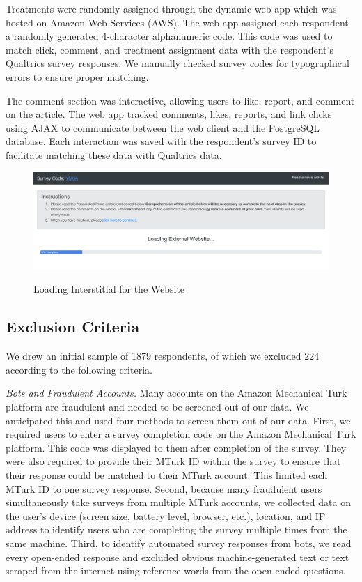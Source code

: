 \documentclass[]{article}
\begin{document}
Treatments were randomly assigned through the dynamic web-app which was hosted on Amazon Web Services (AWS). The web app assigned each respondent a randomly generated 4-character alphanumeric code. This code was used to match click, comment, and treatment assignment data with the respondent's Qualtrics survey responses. We manually checked survey codes for typographical errors to ensure proper matching.

The comment section was interactive, allowing users to like, report, and comment on the article. The web app tracked comments, likes, reports, and link clicks using AJAX to communicate between the web client and the PostgreSQL database. Each interaction was saved with the respondent's survey ID to facilitate matching these data with Qualtrics data.

\vspace{-1em}
\begin{figure}[!htbp]
  \centering
  \caption{Loading Interstitial for the Website}
  \vspace{1em}
  \includegraphics[width=.9\textwidth]{figures/loading_interstitial.pdf}\\
  \label{hom_uns}
\end{figure}

\subsection{Exclusion Criteria}

We drew an initial sample of 1879 respondents, of which we excluded 224 according to the following criteria.

\textit{Bots and Fraudulent Accounts.} Many accounts on the Amazon Mechanical Turk platform are fraudulent and needed to be screened out of our data. We anticipated this and used four methods to screen them out of our data. First, we required users to enter a survey completion code on the Amazon Mechanical Turk platform. This code was displayed to them after completion of the survey. They were also required to provide their MTurk ID within the survey to ensure that their response could be matched to their MTurk account. This limited each MTurk ID to one survey response. Second, because many fraudulent users simultaneously take surveys from multiple MTurk accounts, we collected data on the user's device (screen size, battery level, browser, etc.), location, and IP address to identify users who are completing the survey multiple times from the same machine. Third, to identify automated survey responses from bots, we read every open-ended response and excluded obvious machine-generated text or text scraped from the internet using reference words from the open-ended questions. 
\end{document}
